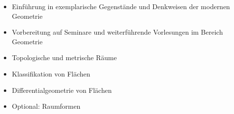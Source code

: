 \begin{module}
\begin{learningoutcomes}
\begin{itemize}\item Einführung in exemplarische Gegenstände und Denkweisen der modernen Geometrie  \item Vorbereitung auf Seminare und weiterführende Vorlesungen im Bereich Geometrie  \end{itemize}
\end{learningoutcomes}

\begin{content}
\begin{itemize}\item Topologische und metrische Räume  \item Klassifikation von Flächen  \item Differentialgeometrie von Flächen  \item Optional: Raumformen  \end{itemize}
\end{content}



\end{module}

